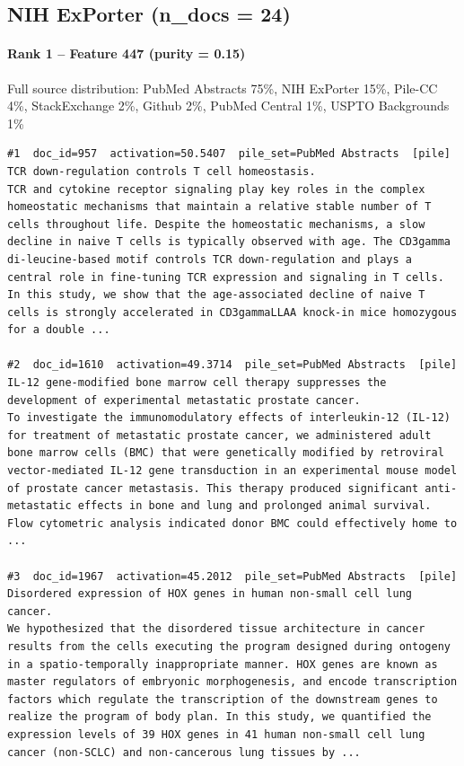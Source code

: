 \subsection*{NIH ExPorter (n\_docs = 24)}

\paragraph*{Rank 1 -- Feature 447 (purity = 0.15)}

Full source distribution: PubMed Abstracts 75\%, NIH ExPorter 15\%, Pile-CC 4\%, StackExchange 2\%, Github 2\%, PubMed Central 1\%, USPTO Backgrounds 1\%

\begin{verbatim}
#1  doc_id=957  activation=50.5407  pile_set=PubMed Abstracts  [pile]
TCR down-regulation controls T cell homeostasis.
TCR and cytokine receptor signaling play key roles in the complex homeostatic mechanisms that maintain a relative stable number of T cells throughout life. Despite the homeostatic mechanisms, a slow decline in naive T cells is typically observed with age. The CD3gamma di-leucine-based motif controls TCR down-regulation and plays a central role in fine-tuning TCR expression and signaling in T cells. In this study, we show that the age-associated decline of naive T cells is strongly accelerated in CD3gammaLLAA knock-in mice homozygous for a double ...

#2  doc_id=1610  activation=49.3714  pile_set=PubMed Abstracts  [pile]
IL-12 gene-modified bone marrow cell therapy suppresses the development of experimental metastatic prostate cancer.
To investigate the immunomodulatory effects of interleukin-12 (IL-12) for treatment of metastatic prostate cancer, we administered adult bone marrow cells (BMC) that were genetically modified by retroviral vector-mediated IL-12 gene transduction in an experimental mouse model of prostate cancer metastasis. This therapy produced significant anti-metastatic effects in bone and lung and prolonged animal survival. Flow cytometric analysis indicated donor BMC could effectively home to ...

#3  doc_id=1967  activation=45.2012  pile_set=PubMed Abstracts  [pile]
Disordered expression of HOX genes in human non-small cell lung cancer.
We hypothesized that the disordered tissue architecture in cancer results from the cells executing the program designed during ontogeny in a spatio-temporally inappropriate manner. HOX genes are known as master regulators of embryonic morphogenesis, and encode transcription factors which regulate the transcription of the downstream genes to realize the program of body plan. In this study, we quantified the expression levels of 39 HOX genes in 41 human non-small cell lung cancer (non-SCLC) and non-cancerous lung tissues by ...


\end{verbatim}
